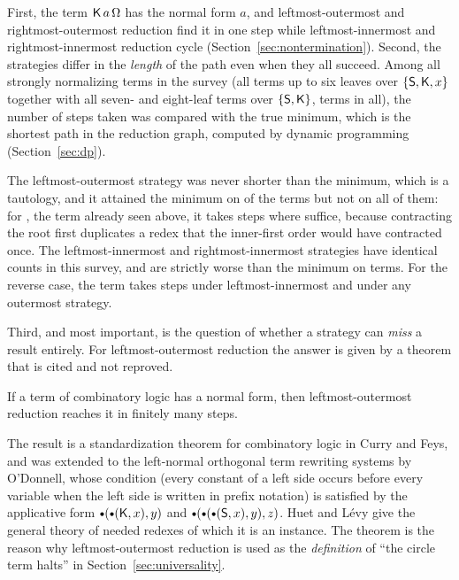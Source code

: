 First, the term $\mathsf{K}\,a\,\Omega$ has the normal form $a$, and leftmost-outermost and rightmost-outermost reduction find it in one step while leftmost-innermost and rightmost-innermost reduction cycle (Section~\ref{sec:nontermination}). Second, the strategies differ in the \emph{length} of the path even when they all succeed. Among all strongly normalizing terms in the survey (all terms up to six leaves over $\{\mathsf{S},\mathsf{K},x\}$ together with all seven- and eight-leaf terms over $\{\mathsf{S},\mathsf{K}\}$, \factOptTerms{} terms in all), the number of steps taken was compared with the true minimum, which is the shortest path in the reduction graph, computed by dynamic programming (Section~\ref{sec:dp}).

\begin{center}
\tableOptimal
\end{center}

The leftmost-outermost strategy was never shorter than the minimum, which is a tautology, and it attained the minimum on \factLoOptPct{} of the terms but not on all of them: for \factLoExample, the term already seen above, it takes \factLoExampleLo{} steps where \factLoExampleBest{} suffice, because contracting the root first duplicates a redex that the inner-first order would have contracted once. The leftmost-innermost and rightmost-innermost strategies have identical counts in this survey, and are strictly worse than the minimum on \factLiWorse{} terms. For the reverse case, the term \factLiExample{} takes \factLiExampleLi{} steps under leftmost-innermost and \factLiExampleBest{} under any outermost strategy.

Third, and most important, is the question of whether a strategy can \emph{miss} a result entirely. For leftmost-outermost reduction the answer is given by a theorem that is cited and not reproved.

\begin{theorem}\label{thm:leftmost}
If a term of combinatory logic has a normal form, then leftmost-outermost reduction reaches it in finitely many steps.
\end{theorem}

The result is a standardization theorem for combinatory logic in Curry and Feys, and was extended to the left-normal orthogonal term rewriting systems by O'Donnell, whose condition (every constant of a left side occurs before every variable when the left side is written in prefix notation) is satisfied by the applicative form $\App(\App(\Kc,x),y)$ and $\App(\App(\App(\Sc,x),y),z)$. Huet and L\'evy give the general theory of needed redexes of which it is an instance. The theorem is the reason why leftmost-outermost reduction is used as the \emph{definition} of ``the circle term halts'' in Section~\ref{sec:universality}.

